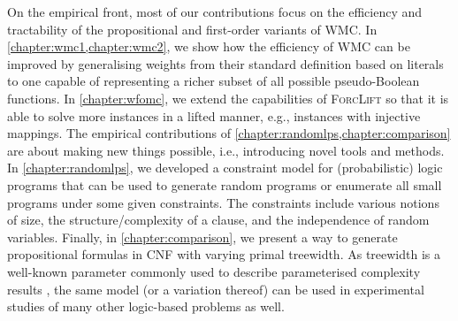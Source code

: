 On the empirical front, most of our contributions focus on the efficiency and
tractability of the propositional and first-order variants of WMC\@. In
\cref{chapter:wmc1,chapter:wmc2}, we show how the efficiency of WMC can be
improved by generalising weights from their standard definition based on
literals to one capable of representing a richer subset of all possible
pseudo-Boolean functions. In \cref{chapter:wfomc}, we extend the capabilities of
\textsc{ForcLift} \citep{DBLP:conf/ijcai/BroeckTMDR11} so that it is able to
solve more instances in a lifted manner, e.g., instances with injective
mappings. The empirical contributions of
\cref{chapter:randomlps,chapter:comparison} are about making new things
possible, i.e., introducing novel tools and methods. In
\cref{chapter:randomlps}, we developed a constraint model for (probabilistic)
logic programs that can be used to generate random programs or enumerate all
small programs under some given constraints. The constraints include various
notions of size, the structure/complexity of a clause, and the independence of
random variables. Finally, in \cref{chapter:comparison}, we present a way to
generate propositional formulas in CNF with varying primal treewidth. As
treewidth is a well-known parameter commonly used to describe parameterised
complexity results \citep{DBLP:series/txcs/DowneyF13}, the same model (or a
variation thereof) can be used in experimental studies of many other logic-based
problems as well.


